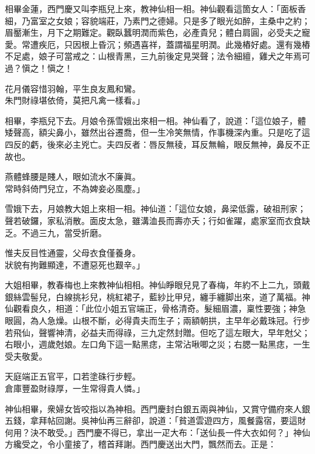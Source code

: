 相畢金蓮，西門慶又叫李瓶兒上來，教神仙相一相。神仙觀看這箇女人：「面板香細，{}乃富室之女娘；容貌端莊，乃素門之德婦。只是多了眼光如醉，{}主桑中之約；眉靨漸生，月下之期難定。觀臥蠶明潤而紫色，必產貴兒；體白肩圓，必受夫之寵愛。常遭疾厄，只因根上昏沉；頻遇喜祥，蓋謂福星明潤。此幾樁好處。還有幾樁不足處，娘子可當戒之：山根青黑，三九前後定見哭聲；法令細繵，雞犬之年焉可過？愼之！愼之！

\begin{myquote}
花月儀容惜羽翰，平生良友鳳和鸞。\\朱門財祿堪依倚，莫把凡禽一樣看。」
\end{myquote}

相畢，李瓶兒下去。月娘令孫雪娥出來相一相。神仙看了，說道：「這位娘子，體矮聲高，額尖鼻小，{}雖然出谷遷喬，但一生冷笑無情，作事機深內重。只是吃了這四反的虧，後來必主兇亡。夫四反者：唇反無稜，耳反無輪，眼反無神，鼻反不正故也。

\begin{myquote}
燕體蜂腰是賤人，眼如流水不廉眞。\\常時斜倚門兒立，不為婢妾必風塵。」
\end{myquote}

雪娥下去，月娘教大姐上來相一相。神仙道：「這位女娘，鼻梁低露，破祖刑家；聲若破鑼，{}家私消散。面皮太急，雖溝洫長而壽亦夭；行如雀躍，處家室而衣食缺乏。不過三九，當受折磨。

\begin{myquote}
惟夫反目性通靈，父母衣食僅養身。\\狀貌有拘難顯達，不遭惡死也艱辛。」
\end{myquote}

大姐相畢，教春梅也上來教神仙相相。神仙睜眼兒見了春梅，年約不上二九，頭戴銀絲雲髻兒，白線挑衫兒，桃紅裙子，藍紗比甲兒，纏手纏脚出來，道了萬福。神仙觀看良久，相道：「此位小姐五官端正，骨格清奇。髮細眉濃，稟性要強；神急眼圓，為人急燥。{}山根不斷，必得貴夫而生子；兩額朝拱，主早年必戴珠冠。行步若飛仙，聲響神清，必益夫而得祿，三九定然封贈。但吃了這左眼大，早年尅父；右眼小，週歲尅娘。{}左口角下這一點黑痣，主常沾啾唧之災；右腮一點黑痣，一生受夫敬愛。

\begin{myquote}
天庭端正五官平，口若塗硃行步輕。\\倉庫豐盈財祿厚，一生常得貴人憐。」
\end{myquote}

神仙相畢，衆婦女皆咬指以為神相。西門慶封白銀五兩與神仙，又賞守備府來人銀五錢，拿拜帖回謝。吳神仙再三辭卻，說道：「貧道雲遊四方，風餐露宿，要這財何用？決不敢受。」西門慶不得已，拿出一疋大布：「送仙長一件大衣如何？」神仙方纔受之，令小童接了，稽首拜謝。西門慶送出大門，飄然而去。正是：

